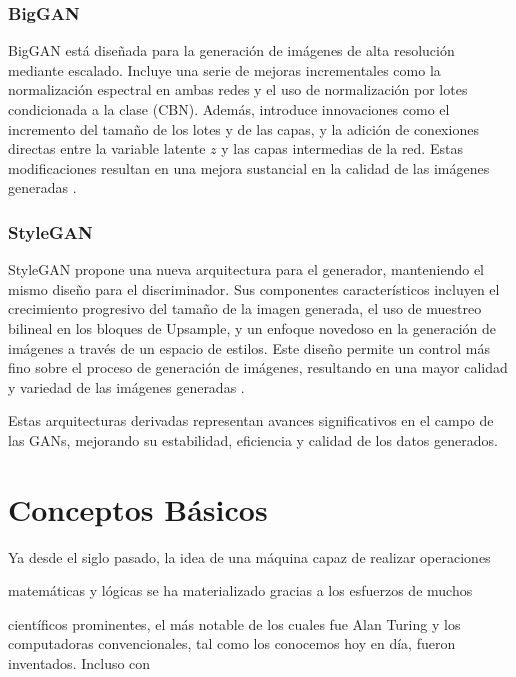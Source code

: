 \subsubsection{BigGAN}
BigGAN está diseñada para la generación de imágenes de alta resolución mediante escalado. Incluye una serie de mejoras incrementales como la normalización espectral en ambas redes y el uso de normalización por lotes condicionada a la clase (CBN). Además, introduce innovaciones como el incremento del tamaño de los lotes y de las capas, y la adición de conexiones directas entre la variable latente \( z \) y las capas intermedias de la red. Estas modificaciones resultan en una mejora sustancial en la calidad de las imágenes generadas \cite{biggan}.

\subsubsection{StyleGAN}
StyleGAN propone una nueva arquitectura para el generador, manteniendo el mismo diseño para el discriminador. Sus componentes característicos incluyen el crecimiento progresivo del tamaño de la imagen generada, el uso de muestreo bilineal en los bloques de Upsample, y un enfoque novedoso en la generación de imágenes a través de un espacio de estilos. Este diseño permite un control más fino sobre el proceso de generación de imágenes, resultando en una mayor calidad y variedad de las imágenes generadas \cite{stylegan}.

Estas arquitecturas derivadas representan avances significativos en el campo de las GANs, mejorando su estabilidad, eficiencia y calidad de los datos generados.



\newpage
\thispagestyle{empty} %
\mbox{} %

\section{Conceptos Básicos}\label{sec:Conceptos basicos}

Ya desde el siglo pasado, la idea de una máquina capaz de realizar operaciones

matemáticas y lógicas se ha materializado gracias a los esfuerzos de muchos

científicos prominentes, el más notable de los cuales fue Alan Turing y los computadoras convencionales, tal como los conocemos hoy en día, fueron inventados. Incluso con

